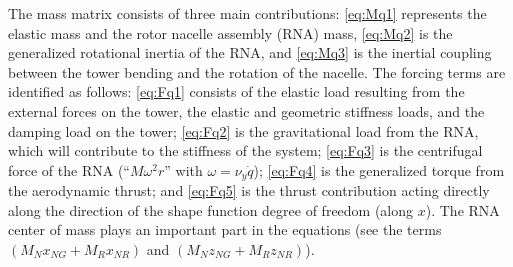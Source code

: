 \documentclass[wes, manuscript]{copernicus}
\begin{document}
The mass matrix consists of three main contributions:
\autoref{eq:Mq1} represents the elastic mass and the rotor nacelle assembly (RNA) mass,
\autoref{eq:Mq2} is the generalized rotational inertia of the RNA, and
\autoref{eq:Mq3} is the inertial coupling between the tower bending and the rotation of the nacelle.
The forcing terms are identified as follows:
\autoref{eq:Fq1} consists of the elastic load resulting from the external forces on the tower, the elastic and geometric stiffness loads, and the damping load on the tower; 
\autoref{eq:Fq2} is the gravitational load from the RNA, which will contribute to the stiffness of the system; 
\autoref{eq:Fq3} is the centrifugal force of the RNA (``$M \omega^2 r$'' with $\omega=\nu_y \dot{q}$);
\autoref{eq:Fq4} is the generalized torque from the aerodynamic thrust; and  
\autoref{eq:Fq5} is the thrust contribution acting directly along the direction of the shape function degree of freedom (along $x$).
The RNA center of mass plays an important part in the equations (see the terms $(M_N x_{NG}+M_R x_{NR})$ and $(M_N z_{NG}+M_R z_{NR})$). 
\end{document}
